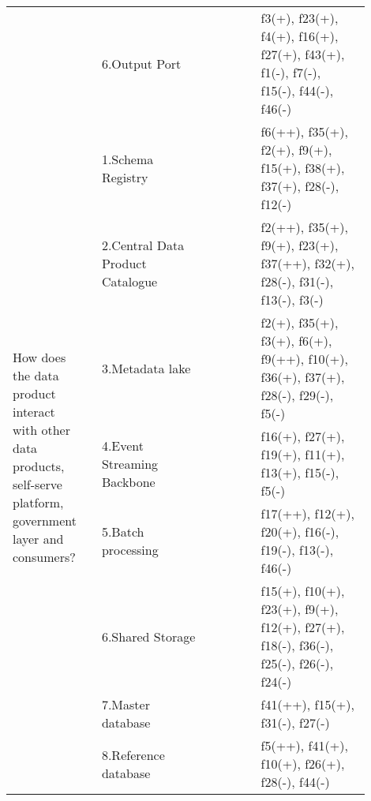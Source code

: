 \begin{tabular}{|p{0.12\linewidth}|p{0.015\linewidth}|p{0.3\linewidth}|p{0.15\linewidth}|p{0.31\linewidth}|}
 & \multirow{-6}{\linewidth}{ \cellcolor{emerald_shape_6}{35}} &6.Output Port&\cellcolor{emerald_shape_7}{s1, s2, s3, s7, s8, s10, s13, s14, s15, s16, s23, s24, s27, s29, s33, s36, s37, s40, s41, s49, s52, s57, p2, p3, p4, p6, p7, p8} & f3(+), f23(+), f4(+), f16(+), f27(+), f43(+), f1(-), f7(-), f15(-), f44(-), f46(-)\\
\multirow{9}{\linewidth}{How does the data product interact with other data products, self-serve platform, government layer and consumers?} &\cellcolor{emerald_shape_7}{} &1.Schema Registry&\cellcolor{emerald_shape_4}{s3, s6, s7, s15, s16, s17, s19, s20, s24, s41, s47, s48, s54, s57, p3, p5, p6, p7, p8, p10} & f6(++), f35(+), f2(+), f9(+), f15(+), f38(+), f37(+), f28(-), f12(-)\\
 & \cellcolor{emerald_shape_7}{} & 2.Central Data Product Catalogue&\cellcolor{emerald_shape_5}{s5, s9, s15, s20, s23, s31, s32, s39, s40, s42, s45, s46, s47, s48, s49, s53, s54, s55, p1, p3, p8, p9} & f2(++), f35(+), f9(+), f23(+), f37(++), f32(+), f28(-), f31(-), f13(-), f3(-)\\
 & \cellcolor{emerald_shape_7}{} & 3.Metadata lake&\cellcolor{emerald_shape_4}{s7, s20, s25, s31, s37, s38, s42, s43, s45, s49, s52, p1, p2, p6, p8} & f2(+), f35(+), f3(+), f6(+), f9(++), f10(+), f36(+), f37(+), f28(-), f29(-), f5(-)\\
 & \cellcolor{emerald_shape_7}{} & 4.Event Streaming Backbone&\cellcolor{emerald_shape_5}{s4, s9, s17, s20, s26, s33, s34, s36, s38, s41, s44, s45, s48, s51, s52, s53, s55, s56, s57, p1, p2, p3, p5, p6, p7, p10} & f16(+), f27(+), f19(+), f11(+), f13(+), f15(-), f5(-)\\
 & \cellcolor{emerald_shape_7}{} & 5.Batch processing&\cellcolor{emerald_shape_4}{s14, s15, s19, s28, s30, s32, s36, s38, s39, s41, s43, s44, s49, s51, s53, s57, p1, p2, p3, p6, p9} & f17(++), f12(+), f20(+), f16(-), f19(-), f13(-), f46(-)\\
 & \cellcolor{emerald_shape_7}{} & 6.Shared Storage&\cellcolor{emerald_shape_3}{s19, s25, s33, s36, s38, s40, p1, p3, p6, p9} & f15(+), f10(+), f23(+), f9(+), f12(+), f27(+), f18(-), f36(-), f25(-), f26(-), f24(-)\\
 & \cellcolor{emerald_shape_7}{} & 7.Master database&\cellcolor{emerald_shape_4}{s4, s7, s9, s23, s44, s48, s56, p1, p2, p3, p5, p6, p7, p8} & f41(++), f15(+), f31(-), f27(-)\\
 & \cellcolor{emerald_shape_7}{} & 8.Reference database&\cellcolor{emerald_shape_1}{p1, p2, p3} & f5(++), f41(+), f10(+), f26(+), f28(-), f44(-)\\

\end{tabular}

